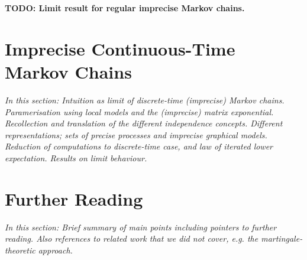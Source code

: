 \documentclass[graybox]{svmult}
\begin{document}
{\bf TODO: Limit result for regular imprecise Markov chains. }

\section{Imprecise Continuous-Time Markov Chains}

\emph{In this section: Intuition as limit of discrete-time (imprecise) Markov chains. Paramerisation using local models and the (imprecise) matrix exponential. Recollection and translation of the different independence concepts. Different representations; sets of precise processes and imprecise graphical models. Reduction of computations to discrete-time case, and law of iterated lower expectation. Results on limit behaviour.}

\section{Further Reading}

\emph{In this section: Brief summary of main points including pointers to further reading. Also references to related work that we did not cover, e.g. the martingale-theoretic approach.}
\end{document}
